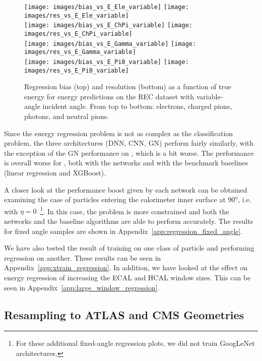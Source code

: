 \begin{figure*}[htbp]
\centering
\texttt{[image: images/bias\_vs\_E\_Ele\_variable]}
\texttt{[image: images/res\_vs\_E\_Ele\_variable]} \\
\texttt{[image: images/bias\_vs\_E\_ChPi\_variable]}
\texttt{[image: images/res\_vs\_E\_ChPi\_variable]}\\
\texttt{[image: images/bias\_vs\_E\_Gamma\_variable]}
\texttt{[image: images/res\_vs\_E\_Gamma\_variable]}\\
\texttt{[image: images/bias\_vs\_E\_Pi0\_variable]}
\texttt{[image: images/res\_vs\_E\_Pi0\_variable]}
\caption{Regression bias (top) and resolution (bottom) as a function
  of true energy for energy predictions on the REC dataset with
  variable-angle incident angle. From top to bottom: electrons,
  charged pions, photons, and neutral
  pions.\label{fig:reg_dnn_vs_cnn_variable}}
\end{figure*}

Since the energy regression problem is not as complex as the classification problem, the three architectures (DNN, CNN, GN) perform fairly similarly, with the exception of the GN performance on \chpi, which is a bit worse.
The performance is overall worse for \chpi, both with the networks and with the benchmark baselines (linear regression and XGBoost).

A closer look at the performance boost given by each network can be obtained examining the case of particles entering the calorimeter inner surface at $90^{\mathrm o}$, i.e. with $\eta=0$~\footnote{For these additional fixed-angle regression plots, we did not train GoogLeNet architectures.}. In this case, the problem is more constrained and both the networks and the baseline algorithms are able to perform accurately. The results for fixed angle samples are shown in Appendix~\ref{app:regression_fixed_angle}.

We have also tested the result of training on one class of particle and performing regression on another. These results can be seen in Appendix~\ref{app:xtrain_regression}. In addition, we have looked at the effect on energy regression of increasing the ECAL and HCAL window sizes. This can be seen in Appendix~\ref{app:large_window_regression}.

\subsection{Resampling to ATLAS and CMS Geometries}\label{sec:resampling}

